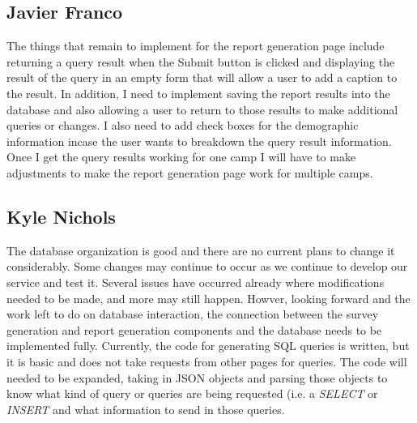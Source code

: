 \documentclass[letterpaper,10pt,serif, draftclsnofoot,onecolumn, compsoc, titlepage]{IEEEtran}
\begin{document}
\subsection{Javier Franco}
The things that remain to implement for the report generation page include returning a query result when the Submit button is clicked and displaying the result of the query in an empty form that will allow a user to add a caption to the result.  In addition, I need to implement saving the report results into the database and also allowing a user to return to those results to make additional queries or changes. I also need to add check boxes for the demographic information incase the user wants to breakdown the query result information. Once I get the query results working for one camp I will have to make adjustments to make the report generation page work for multiple camps. 

\subsection{Kyle Nichols}
The database organization is good and there are no current plans to change it considerably.
Some changes may continue to occur as we continue to develop our service and test it.
Several issues have occurred already where modifications needed to be made, and more may still happen.
Howver, looking forward and the work left to do on database interaction, the connection between the survey generation and report generation components and the database needs to be implemented fully.
Currently, the code for generating SQL queries is written, but it is basic and does not take requests from other pages for queries.
The code will needed to be expanded, taking in JSON objects and parsing those objects to know what kind of query or queries are being requested (i.e. a \emph{SELECT} or \emph{INSERT} and what information to send in those queries.
\end{document}
